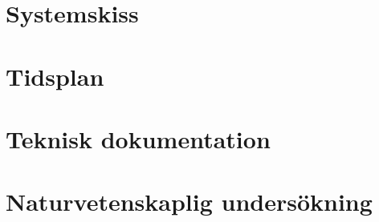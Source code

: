 \documentclass[a4paper,12pt,twoside,openright]{report}
\begin{document}
\begin{appendices}
\chapter{Systemskiss}
\label{appendix:systemskiss}
\clearpage
\null
\newpage
	
%
%

\chapter{Tidsplan}
\label{appendix:tidplan}
\clearpage
\null
\newpage
		
%
	
\chapter{Teknisk dokumentation}
\label{appendix:teknisk-dokumentation}
\clearpage
\null
\newpage
	
%
%

\chapter{Naturvetenskaplig undersökning}
\label{appendix:naturvetenskaplig}
\clearpage
\null
\newpage

% 

\end{appendices}
\end{document}

